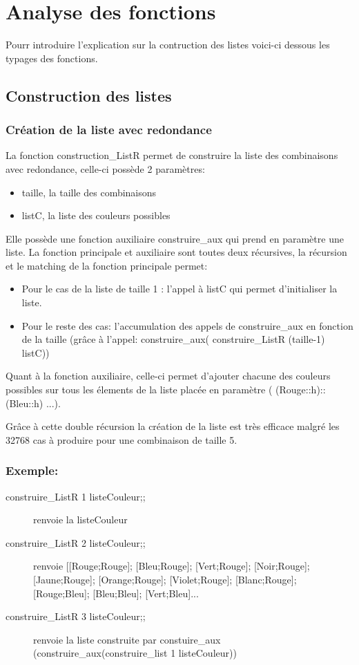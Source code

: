 \documentclass[a4paper,twoside,12pt]{report}
\newcommand{\moncode}[1]{\begin{center}
                        
                        \end{center}}
\begin{document}
\chapter{Analyse des fonctions}
%
Pourr introduire l'explication sur la contruction des listes voici-ci dessous les typages des fonctions.
\moncode{listCouleur.mli}
%
\section{Construction des listes}
%
\moncode{construc.ml}
\subsection{Création de la liste avec redondance}
\par
La fonction construction\_ListR permet de construire la liste des combinaisons avec redondance, celle-ci possède 2 paramètres:
\begin{itemize}
\item taille, la taille des combinaisons
\item listC, la liste des couleurs possibles
\end{itemize}
\par
Elle possède une fonction auxiliaire construire\_aux qui prend en paramètre une liste.
La fonction principale et auxiliaire sont toutes deux récursives, la récursion et le matching de la fonction principale permet:
\begin{itemize}
\item Pour le cas de la liste de taille 1 : l'appel à listC qui permet d'initialiser la liste.
\item Pour le reste des cas: l'accumulation des appels de construire\_aux en fonction de la taille (grâce à l'appel: construire\_aux( construire\_ListR (taille-1) listC))
\end{itemize}
\par Quant à la fonction auxiliaire, celle-ci permet d'ajouter chacune des couleurs possibles sur tous les élements de la liste placée en paramètre ( (Rouge::h)::(Bleu::h) ...). 
\par Grâce à cette double récursion la création de la liste est très efficace malgré les 32768 cas à produire pour une combinaison de taille 5.
\subsection{Exemple:}
%
\begin{description}
 \item [construire\_ListR 1 listeCouleur;;] renvoie la listeCouleur
 \item [construire\_ListR 2 listeCouleur;;] renvoie [[Rouge;Rouge]; [Bleu;Rouge]; [Vert;Rouge]; [Noir;Rouge]; [Jaune;Rouge]; [Orange;Rouge]; [Violet;Rouge]; [Blanc;Rouge]; [Rouge;Bleu]; [Bleu;Bleu]; [Vert;Bleu]...
 \item [construire\_ListR 3 listeCouleur;;] renvoie la liste construite par constuire\_aux (construire\_aux(construire\_list 1 listeCouleur))
\end{description}
%
\end{document}
